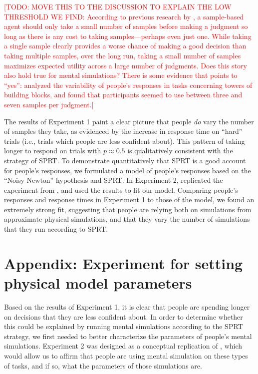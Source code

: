 \documentclass[10pt,letterpaper]{article}
\newcommand{\TODO}[1]{\textcolor{red}{[TODO: #1]}}
\begin{document}
\TODO{MOVE THIS TO THE DISCUSSION TO EXPLAIN THE LOW THRESHOLD WE FIND: According to previous research by \citeA{Vul:2014ba}, a sample-based agent should only take a small number of samples before making a judgment so long as there is any cost to taking samples---perhaps even just one. While taking a single sample clearly provides a worse chance of making a good decision than taking multiple samples, over the long run, taking a small number of samples maximizes expected utility across a large number of judgments. Does this story also hold true for mental simulations? There is some evidence that points to ``yes'': \citeA{Battaglia2013} analyzed the variability of people's responses in tasks concerning towers of building blocks, and found that participants seemed to use between three and seven samples per judgment.}

The results of Experiment 1 paint a clear picture that people \emph{do} vary the number of samples they take, as evidenced by the increase in response time on ``hard'' trials (i.e., trials which people are less confident about).
This pattern of taking longer to respond on trials with $p\approx 0.5$ is qualitatively consistent with the strategy of SPRT.
To demonstrate quantitatively that SPRT is a good account for people's responses, we formulated a model of people's responses based on the ``Noisy Newton'' hypothesis and SPRT.
In Experiment 2, replicated the experiment from , and used the results to fit our model.
Comparing people's responses and response times in Experiment 1 to those of the model, we found an extremely strong fit, suggesting that people are relying both on simulations from approximate physical simulations, and that they vary the number of simulations that they run according to SPRT.

\section{Appendix: Experiment for setting physical model parameters}

Based on the results of Experiment 1, it is clear that people are spending longer on decisions that they are less confident about.
In order to determine whether this could be explained by running mental simulations according to the SPRT strategy, we first needed to better characterize the parameters of people's mental simulations.
Experiment 2 was designed as a conceptual replication of , which would allow us to affirm that people are using mental simulation on these types of tasks, and if so, what the parameters of those simulations are.
\end{document}

